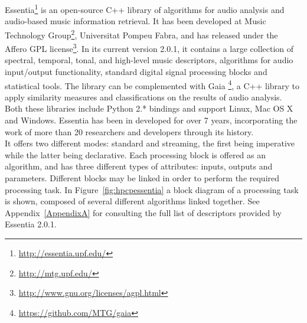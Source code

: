 Essentia\footnote{\url{http://essentia.upf.edu/}} is an open-source C++ library of algorithms for audio analysis and audio-based music information retrieval. It has been developed at Music Technology Group\footnote{\url{http://mtg.upf.edu/}}, Universitat Pompeu Fabra, and has released under the Affero GPL license\footnote{\url{http://www.gnu.org/licenses/agpl.html}}. In its current version 2.0.1, it contains a large collection of spectral, temporal, tonal, and high-level music descriptors, algorithms for audio input/output functionality, standard digital signal processing blocks and statistical tools. The library can be complemented with Gaia \footnote{\url{https://github.com/MTG/gaia}}, a C++ library to apply similarity measures and classifications on the results of audio analysis. Both these libraries include Python 2.* bindings and support Linux, Mac OS X and Windows. Essentia has been in developed for over 7 years, incorporating the work of more than 20 researchers and developers through its history. \\
It offers two different modes: standard and streaming, the first being imperative while the latter being declarative. Each processing block is offered as an algorithm, and has three different types of attributes: inputs, outputs and parameters. Different blocks may be linked in order to perform the required processing task. In Figure~\ref{fig:hpcpessentia} a block diagram of a processing task is shown, composed of several different algorithms linked together. See Appendix~\ref{AppendixA} for consulting the full list of descriptors provided by Essentia 2.0.1.



